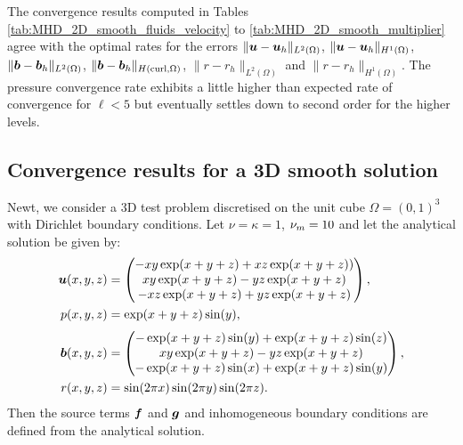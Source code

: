 The convergence results computed in  Tables \ref{tab:MHD_2D_smooth_fluids_velocity} to \ref{tab:MHD_2D_smooth_multiplier} agree with the optimal rates for the errors $\|\boldsymbol u-\boldsymbol u_h\|_{L^2(\Omega)}$, $\|\boldsymbol u-\boldsymbol u_h\|_{H^1(\Omega)}$, $\|\boldsymbol b-\boldsymbol b_h\|_{L^2(\Omega)}$, $\|\boldsymbol b-\boldsymbol b_h\|_{H({\rm curl},\Omega)}$, $\|{r}-{r}_h\|_{L^2(\Omega)}$ and $\|{r}-{r}_h\|_{H^1(\Omega)}$. The pressure convergence rate  exhibits a little higher than expected rate of convergence for $\ell<5$ but eventually settles down to second order for the higher levels.





\subsection{Convergence results for a 3D smooth solution}
\label{sec:3Dsetup}

Newt, we consider a 3D test problem discretised on the unit cube $\Omega = (0,1)^3$ with Dirichlet boundary conditions. Let $\nu = \kappa =1$, $\nu_m=\rm{10}$ and let the analytical solution be given by:
\begin{align*} \nonumber
\boldsymbol u(x,y,z)& =\begin{pmatrix}
-xy\exp(x + y + z) + xz\exp(x + y + z))\\
xy\exp(x + y + z) - yz\exp(x + y + z)\\
-xz\exp(x + y + z) + yz\exp(x + y + z)
\end{pmatrix},\\
p(x,y,z)& =\exp(x + y + z)\sin(y),\\[0.1cm]
\boldsymbol b(x,y,z)& =\begin{pmatrix}
 -\exp(x + y + z)\sin(y) + \exp(x + y + z)\sin(z) \\
xy\exp(x + y + z) - yz\exp(x + y + z) \\
-\exp(x + y + z)\sin(x) + \exp(x + y + z)\sin(y)
\end{pmatrix},\\
 r(x,y,z)& =\sin(2\pi x)\sin(2\pi y)\sin(2\pi z).
\end{align*}
Then the source terms $\boldsymbol f$ and $\boldsymbol g$ and inhomogeneous boundary conditions are defined from the analytical solution.

